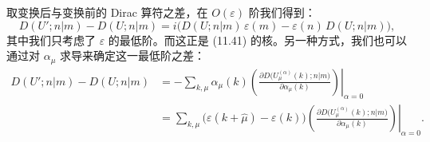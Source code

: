 取变换后与变换前的 Dirac 算符之差，在 $O(\varepsilon)$ 阶我们得到：
\begin{equation}
D(U'; n|m) - D(U; n|m)
= i\bigl(D(U; n|m)\,\varepsilon(m) - \varepsilon(n)\, D(U; n|m)\bigr) ,
\end{equation}
其中我们只考虑了 $\varepsilon$ 的最低阶。而这正是 (11.41) 的核。另一种方式，我们也可以通过对 $\alpha_\mu$ 求导来确定这一最低阶之差：
\begin{equation}
\begin{aligned}
D(U'; n|m) - D(U; n|m)
&= -\sum_{k,\mu} \alpha_\mu(k)
\left.\left(\frac{\partial D\bigl(U_\mu^{(\alpha)}(k); n|m\bigr)}
{\partial\alpha_\mu(k)}\right)\right|_{\alpha=0} \\
&= \sum_{k,\mu} \bigl(\varepsilon(k + \hat{\mu}) - \varepsilon(k)\bigr)
\left.\left(\frac{\partial D\bigl(U_\mu^{(\alpha)}(k); n|m\bigr)}
{\partial\alpha_\mu(k)}\right)\right|_{\alpha=0} .
\end{aligned}
\end{equation}

